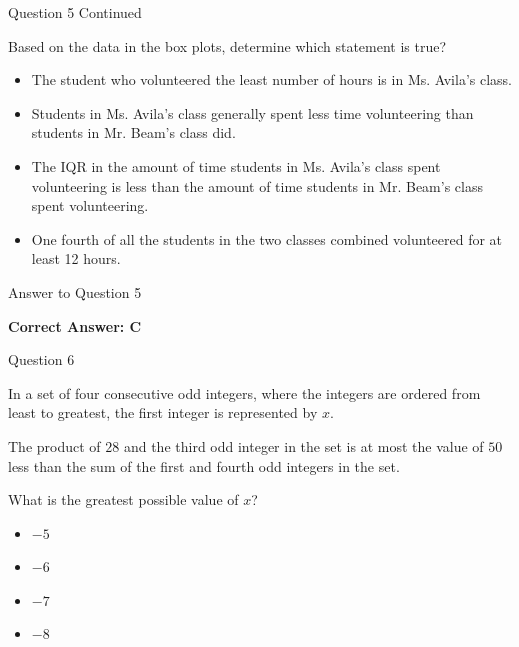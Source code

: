 \documentclass{beamer}
\begin{document}
\begin{frame}{Question 5 Continued}

Based on the data in the box plots, determine which statement is true?

\begin{itemize}
    \item[A.] The student who volunteered the least number of hours is in Ms. Avila's class.
    \item[B.] Students in Ms. Avila's class generally spent less time volunteering than students in Mr. Beam's class did.
    \item[C.] The IQR in the amount of time students in Ms. Avila's class spent volunteering is less than the amount of time students in Mr. Beam's class spent volunteering.
    \item[D.] One fourth of all the students in the two classes combined volunteered for at least 12 hours.
\end{itemize}

\end{frame}

\begin{frame}{Answer to Question 5}

\textbf{Correct Answer: C}

\end{frame}


\begin{frame}{Question 6}

In a set of four consecutive odd integers, where the integers are ordered from least to greatest, the first integer is represented by $x$.

The product of $28$ and the third odd integer in the set is at most the value of $50$ less than the sum of the first and fourth odd integers in the set.

What is the greatest possible value of $x$?

\begin{itemize}
    \item[A.] $-5$
    \item[B.] $-6$
    \item[C.] $-7$
    \item[D.] $-8$
\end{itemize}

\end{frame}
\end{document}
